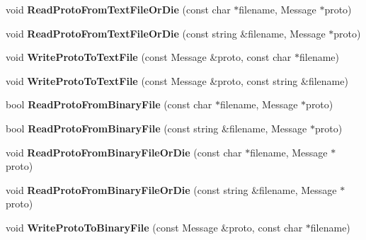\begin{DoxyCompactItemize}
\item 
void {\bfseries Read\+Proto\+From\+Text\+File\+Or\+Die} (const char $\ast$filename, Message $\ast$proto)\hypertarget{namespacecaffe_ac61af043ef0a554362c306d71f5e3ec8}{}\label{namespacecaffe_ac61af043ef0a554362c306d71f5e3ec8}

\item 
void {\bfseries Read\+Proto\+From\+Text\+File\+Or\+Die} (const string \&filename, Message $\ast$proto)\hypertarget{namespacecaffe_aecbc91102c643097b7f677c18ba303c3}{}\label{namespacecaffe_aecbc91102c643097b7f677c18ba303c3}

\item 
void {\bfseries Write\+Proto\+To\+Text\+File} (const Message \&proto, const char $\ast$filename)\hypertarget{namespacecaffe_aa2f483e4300ceff4497891db10371056}{}\label{namespacecaffe_aa2f483e4300ceff4497891db10371056}

\item 
void {\bfseries Write\+Proto\+To\+Text\+File} (const Message \&proto, const string \&filename)\hypertarget{namespacecaffe_a06a4e7ad1a73458c73e45bbdd2eb207d}{}\label{namespacecaffe_a06a4e7ad1a73458c73e45bbdd2eb207d}

\item 
bool {\bfseries Read\+Proto\+From\+Binary\+File} (const char $\ast$filename, Message $\ast$proto)\hypertarget{namespacecaffe_a28f2320f8f918424c3b3de6263cf9373}{}\label{namespacecaffe_a28f2320f8f918424c3b3de6263cf9373}

\item 
bool {\bfseries Read\+Proto\+From\+Binary\+File} (const string \&filename, Message $\ast$proto)\hypertarget{namespacecaffe_a6b764e3a59e45b9a0b5e1cc28426a78c}{}\label{namespacecaffe_a6b764e3a59e45b9a0b5e1cc28426a78c}

\item 
void {\bfseries Read\+Proto\+From\+Binary\+File\+Or\+Die} (const char $\ast$filename, Message $\ast$proto)\hypertarget{namespacecaffe_a52a3e6165fee228f7976faccedc1d2b1}{}\label{namespacecaffe_a52a3e6165fee228f7976faccedc1d2b1}

\item 
void {\bfseries Read\+Proto\+From\+Binary\+File\+Or\+Die} (const string \&filename, Message $\ast$proto)\hypertarget{namespacecaffe_a9e124d475fbfbaeb7ad8b1baee9a2a9b}{}\label{namespacecaffe_a9e124d475fbfbaeb7ad8b1baee9a2a9b}

\item 
void {\bfseries Write\+Proto\+To\+Binary\+File} (const Message \&proto, const char $\ast$filename)\hypertarget{namespacecaffe_a6e669ab7a89a744359cbb041021b6332}{}\label{namespacecaffe_a6e669ab7a89a744359cbb041021b6332}


\end{DoxyCompactItemize}
